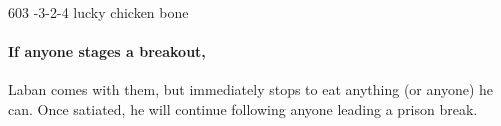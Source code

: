 \begin{multicols}{2}
%
  {{6}{0}{3}}%
  {{-3}{-2}{-4}}%
  {%
  }%
  {}%
  {lucky chicken bone}%
  {}%

\paragraph{If anyone stages a breakout,}
Laban comes with them, but immediately stops to eat anything (or anyone) he can.
Once satiated, he will continue following anyone leading a prison break.

\end{multicols}
